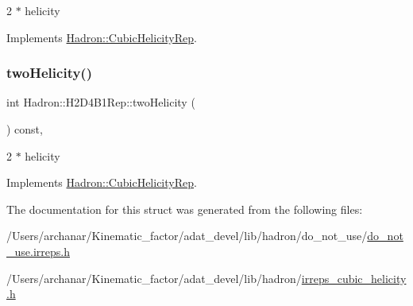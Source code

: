 2 $\ast$ helicity 

Implements \mbox{\hyperlink{structHadron_1_1CubicHelicityRep_af507aa56fc2747eacc8cb6c96db31ecc}{Hadron\+::\+Cubic\+Helicity\+Rep}}.

\mbox{\label{structHadron_1_1H2D4B1Rep_af76e49b62cabfe0d55dec970eca37ca3}} 
\subsubsection{\texorpdfstring{twoHelicity()}{twoHelicity()}\hspace{0.1cm}{\footnotesize\ttfamily [2/2]}}
{\footnotesize\ttfamily int Hadron\+::\+H2\+D4\+B1\+Rep\+::two\+Helicity (\begin{DoxyParamCaption}{ }\end{DoxyParamCaption}) const\hspace{0.3cm}{\ttfamily [inline]}, {\ttfamily [virtual]}}

2 $\ast$ helicity 

Implements \mbox{\hyperlink{structHadron_1_1CubicHelicityRep_af507aa56fc2747eacc8cb6c96db31ecc}{Hadron\+::\+Cubic\+Helicity\+Rep}}.



The documentation for this struct was generated from the following files\+:\begin{DoxyCompactItemize}
\item 
/\+Users/archanar/\+Kinematic\+\_\+factor/adat\+\_\+devel/lib/hadron/do\+\_\+not\+\_\+use/\mbox{\hyperlink{do__not__use_8irreps_8h}{do\+\_\+not\+\_\+use.\+irreps.\+h}}\item 
/\+Users/archanar/\+Kinematic\+\_\+factor/adat\+\_\+devel/lib/hadron/\mbox{\hyperlink{lib_2hadron_2irreps__cubic__helicity_8h}{irreps\+\_\+cubic\+\_\+helicity.\+h}}\end{DoxyCompactItemize}
